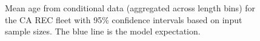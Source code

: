 \documentclass[
]{scrartcl}
\begin{document}
\begin{figure}


\caption{\label{fig-mean-age-3}Mean age from conditional data
(aggregated across length bins) for the CA REC fleet with 95\%
confidence intervals based on input sample sizes. The blue line is the
model expectation.}

\end{figure}%
\end{document}
